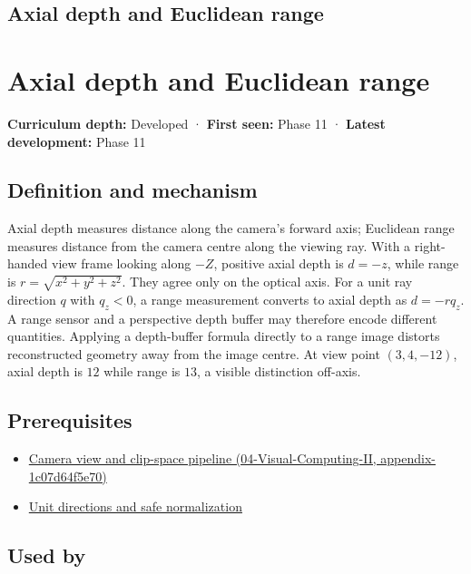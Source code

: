 \hypertarget{appendix-cac01ebeeb11}{}
\section*{Axial depth and Euclidean range}
\chapter{Axial depth and Euclidean range}\label{appendix-cac01ebeeb11-axial-depth-and-euclidean-range}

\textbf{Curriculum depth:} Developed · \textbf{First seen:} Phase 11 · \textbf{Latest development:} Phase 11

\section{Definition and mechanism}\label{appendix-cac01ebeeb11-definition-and-mechanism}

Axial depth measures distance along the camera's forward axis; Euclidean range measures distance from the camera centre along the viewing ray. With a right-handed view frame looking along \(-Z\), positive axial depth is \(d=-z\), while range is \(r=\sqrt{x^2+y^2+z^2}\). They agree only on the optical axis. For a unit ray direction \(q\) with \(q_z<0\), a range measurement converts to axial depth as \(d=-rq_z\). A range sensor and a perspective depth buffer may therefore encode different quantities. Applying a depth-buffer formula directly to a range image distorts reconstructed geometry away from the image centre. At view point \((3,4,-12)\), axial depth is \(12\) while range is \(13\), a visible distinction off-axis.

\section{Prerequisites}\label{appendix-cac01ebeeb11-prerequisites}

\begin{itemize}
\tightlist
\item
  \href{../04-Visual-Computing-II/main.pdf\#nameddest=appendix-1c07d64f5e70}{Camera view and clip-space pipeline (04-Visual-Computing-II, appendix-1c07d64f5e70)}
\item
  \hyperref[appendix-f744e41b95b4]{Unit directions and safe normalization}
\end{itemize}

\section{Used by}\label{appendix-cac01ebeeb11-used-by}

